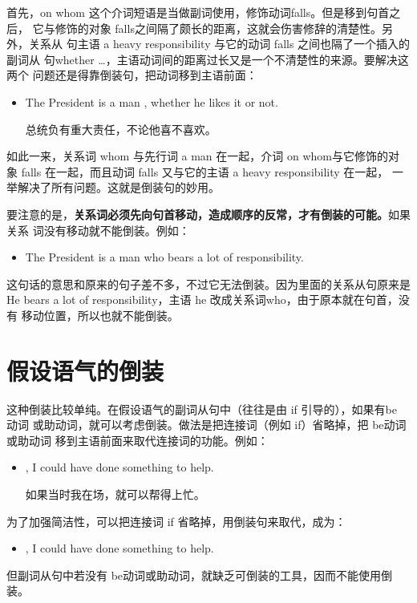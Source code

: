 首先，on whom 这个介词短语是当做副词使用，修饰动词falls。但是移到句首之后，
它与修饰的对象 falls之间隔了颇长的距离，这就会伤害修辞的清楚性。另外，关系从
句主语 a heavy responsibility 与它的动词 falls 之间也隔了一个插入的副词从
句whether \ldots{}，主语动词间的距离过长又是一个不清楚性的来源。要解决这两个
问题还是得靠倒装句，把动词移到主语前面：
\begin{itemize}
\item The President is a man ,
  whether he likes it or not.

  总统负有重大责任，不论他喜不喜欢。
\end{itemize}
如此一来，关系词 whom 与先行词 a man 在一起，介词 on whom与它修饰的对
象 falls 在一起，而且动词 falls 又与它的主语 a heavy responsibility 在一起，
一举解决了所有问题。这就是倒装句的妙用。

要注意的是，\textbf{关系词必须先向句首移动，造成顺序的反常，才有倒装的可能。}如果关系
词没有移动就不能倒装。例如：
\begin{itemize}
\item The President is a man who bears a lot of responsibility.
\end{itemize}
这句话的意思和原来的句子差不多，不过它无法倒装。因为里面的关系从句原来是He
bears a lot of responsibility，主语 he 改成关系词who，由于原本就在句首，没有
移动位置，所以也就不能倒装。

\section{假设语气的倒装}

这种倒装比较单纯。在假设语气的副词从句中（往往是由 if 引导的），如果有be 动词
或助动词，就可以考虑倒装。做法是把连接词（例如 if）省略掉，把 be动词或助动词
移到主语前面来取代连接词的功能。例如：
\begin{itemize}
\item {}, I could have done something to help.

  如果当时我在场，就可以帮得上忙。
\end{itemize}
为了加强简洁性，可以把连接词 if 省略掉，用倒装句来取代，成为：
\begin{itemize}
\item {}, I could have done something to help.
\end{itemize}

但副词从句中若没有 be动词或助动词，就缺乏可倒装的工具，因而不能使用倒装。


